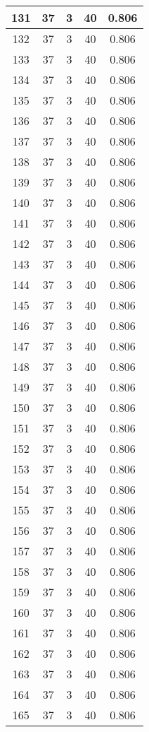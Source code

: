 \documentclass[letterpaper, 12pt]{article}
\begin{document}
\begin{longtable}{|c|c|c|c|c|}
\hline
131 & 37 & 3 & 40 & 0.806 \\
\hline
132 & 37 & 3 & 40 & 0.806 \\
\hline
133 & 37 & 3 & 40 & 0.806 \\
\hline
134 & 37 & 3 & 40 & 0.806 \\
\hline
135 & 37 & 3 & 40 & 0.806 \\
\hline
136 & 37 & 3 & 40 & 0.806 \\
\hline
137 & 37 & 3 & 40 & 0.806 \\
\hline
138 & 37 & 3 & 40 & 0.806 \\
\hline
139 & 37 & 3 & 40 & 0.806 \\
\hline
140 & 37 & 3 & 40 & 0.806 \\
\hline
141 & 37 & 3 & 40 & 0.806 \\
\hline
142 & 37 & 3 & 40 & 0.806 \\
\hline
143 & 37 & 3 & 40 & 0.806 \\
\hline
144 & 37 & 3 & 40 & 0.806 \\
\hline
145 & 37 & 3 & 40 & 0.806 \\
\hline
146 & 37 & 3 & 40 & 0.806 \\
\hline
147 & 37 & 3 & 40 & 0.806 \\
\hline
148 & 37 & 3 & 40 & 0.806 \\
\hline
149 & 37 & 3 & 40 & 0.806 \\
\hline
150 & 37 & 3 & 40 & 0.806 \\
\hline
151 & 37 & 3 & 40 & 0.806 \\
\hline
152 & 37 & 3 & 40 & 0.806 \\
\hline
153 & 37 & 3 & 40 & 0.806 \\
\hline
154 & 37 & 3 & 40 & 0.806 \\
\hline
155 & 37 & 3 & 40 & 0.806 \\
\hline
156 & 37 & 3 & 40 & 0.806 \\
\hline
157 & 37 & 3 & 40 & 0.806 \\
\hline
158 & 37 & 3 & 40 & 0.806 \\
\hline
159 & 37 & 3 & 40 & 0.806 \\
\hline
160 & 37 & 3 & 40 & 0.806 \\
\hline
161 & 37 & 3 & 40 & 0.806 \\
\hline
162 & 37 & 3 & 40 & 0.806 \\
\hline
163 & 37 & 3 & 40 & 0.806 \\
\hline
164 & 37 & 3 & 40 & 0.806 \\
\hline
165 & 37 & 3 & 40 & 0.806 \\

\end{longtable}
\end{document}
